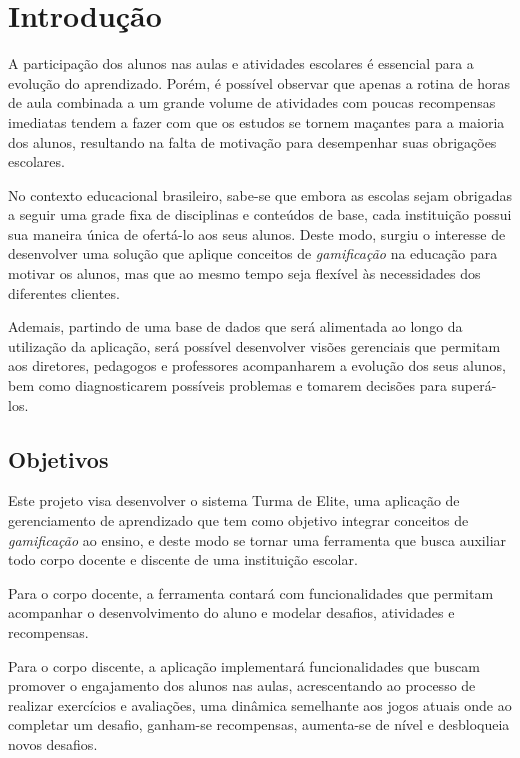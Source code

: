 \documentclass[
    12pt,               %
    openright,          %
    oneside,
    a4paper,            %
    english,            %
    brazil              %
    ]{ifsp-spo-inf-ctds} %
\begin{document}
\textual

\chapter[Introdução]{Introdução}
A participação dos alunos nas aulas e atividades escolares é essencial para a evolução do aprendizado. Porém, é possível observar que apenas a rotina de horas de aula combinada a um grande volume de atividades com poucas recompensas imediatas tendem a fazer com que os estudos se tornem maçantes para a maioria dos alunos, resultando na falta de motivação para desempenhar suas obrigações escolares.


No contexto educacional brasileiro, sabe-se que embora as escolas sejam obrigadas a seguir uma grade fixa de disciplinas e conteúdos de base, cada instituição possui sua maneira única de ofertá-lo aos seus alunos. Deste modo, surgiu o interesse de desenvolver uma solução que aplique conceitos de \textit{gamificação} na educação para motivar os alunos, mas que ao mesmo tempo seja flexível às necessidades dos diferentes clientes. 


Ademais, partindo de uma base de dados que será alimentada ao longo da utilização da aplicação, será possível desenvolver visões gerenciais que permitam aos diretores, pedagogos e professores acompanharem a evolução dos seus alunos, bem como diagnosticarem possíveis problemas e tomarem decisões para superá-los.

\section{Objetivos}
Este projeto visa desenvolver o sistema Turma de Elite, uma aplicação de gerenciamento de aprendizado que tem como objetivo integrar conceitos de \textit{gamificação} ao ensino, e deste modo se tornar uma ferramenta que busca auxiliar todo corpo docente e discente de uma instituição escolar.


Para o corpo docente, a ferramenta contará com funcionalidades que permitam acompanhar o desenvolvimento do aluno e modelar desafios, atividades e recompensas.


Para o corpo discente, a aplicação implementará funcionalidades que buscam promover o engajamento dos alunos nas aulas, acrescentando ao processo de realizar exercícios e avaliações, uma dinâmica semelhante aos jogos atuais onde ao completar um desafio, ganham-se recompensas, aumenta-se de nível e desbloqueia novos desafios.
\end{document}
